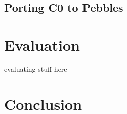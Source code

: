 \documentclass{article}
\begin{document}
\subsection{Porting C0 to Pebbles}
\section{Evaluation}

evaluating stuff here



\section{Conclusion}

{}

\end{document}
